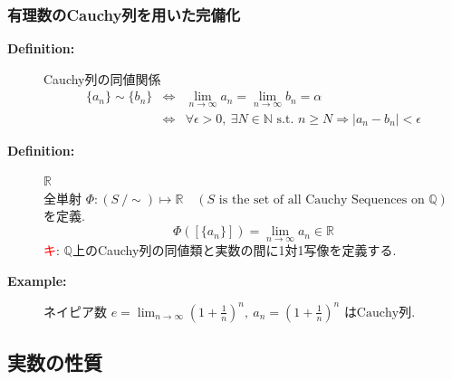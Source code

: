 \documentclass[english,dvipdfmx]{jsarticle}
\newcommand*{\point}{\textcircled{\textcolor{red}{\scriptsize キ}}}
\begin{document}
    \subsubsection{有理数のCauchy列を用いた完備化}
    \begin{description}
    \item[\bf{Definition:}] Cauchy列の同値関係
        \begin{eqnarray*}
            \{ a_n \} \sim \{ b_n \} &\Leftrightarrow& \lim_{n \to \infty} a_n = \lim_{n \to \infty} b_n = \alpha \\
            &\Leftrightarrow& \forall \epsilon > 0,\ \exists N \in \mathbb{N} \text{ s.t. } n \geq N \Rightarrow | a_n - b_n | < \epsilon
        \end{eqnarray*}
    \item[\bf{Definition:}] $\mathbb{R}$ \\
        全単射 $ \Phi : (S \ / \sim) \longmapsto \mathbb{R} \quad ( S \text{ is the set of all Cauchy Sequences on }\mathbb{Q} ) $ を定義.
        \begin{equation*}
            \Phi( [\{ a_n \}] ) = \lim_{n \to \infty} a_n \in \mathbb{R}
        \end{equation*}
        \point : $\mathbb{Q}$上のCauchy列の同値類と実数の間に1対1写像を定義する.
        \item[\bf{Example:}] ネイピア数 $e = \displaystyle \lim_{n \to \infty} ( 1 + \frac{1}{n} )^n ,\ a_n = (1 + \frac{1}{n})^n\text{ はCauchy列.}$ 
    \end{description}
    \subsection{実数の性質}
\end{document}
